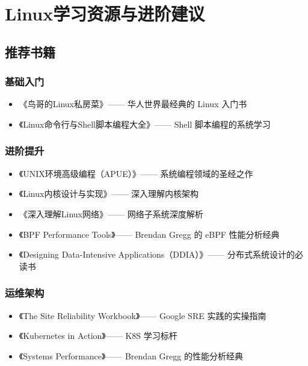 \documentclass[12pt,UTF8]{ctexbook}
\begin{document}
\chapter{Linux学习资源与进阶建议}

\section{推荐书籍}
\subsection*{基础入门}
\begin{itemize}
    \item 《鸟哥的Linux私房菜》—— 华人世界最经典的 Linux 入门书
    \item 《Linux命令行与Shell脚本编程大全》—— Shell 脚本编程的系统学习
\end{itemize}

\subsection*{进阶提升}
\begin{itemize}
    \item 《UNIX环境高级编程（APUE）》—— 系统编程领域的圣经之作
    \item 《Linux内核设计与实现》—— 深入理解内核架构
    \item 《深入理解Linux网络》—— 网络子系统深度解析
    \item 《BPF Performance Tools》—— Brendan Gregg 的 eBPF 性能分析经典
    \item 《Designing Data-Intensive Applications（DDIA）》—— 分布式系统设计的必读书
\end{itemize}

\subsection*{运维架构}
\begin{itemize}
    \item 《The Site Reliability Workbook》—— Google SRE 实践的实操指南
    \item 《Kubernetes in Action》—— K8S 学习标杆
    \item 《Systems Performance》—— Brendan Gregg 的性能分析经典
\end{itemize}
\end{document}
